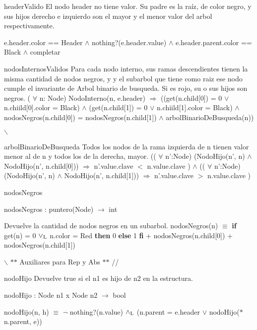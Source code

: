 \begin{DoxyParagraph}{header\-Valido}
\-El nodo header no tiene valor. \-Su padre es la raíz, de color negro, y sus hijos derecho e izquierdo son el mayor y el menor valor del arbol respectivamente.\par
 e.\-header.\-color == \-Header $\land$ nothing?(e.\-header.\-value) $\land$ e.\-header.\-parent.\-color == \-Black $\land$ completar 
\end{DoxyParagraph}
\begin{DoxyParagraph}{nodos\-Internos\-Validos}
\-Para cada nodo interno, sus ramas descendientes tienen la misma cantidad de nodos negros, y y el subarbol que tiene como raiz ese nodo cumple el invariante de \-Arbol binario de busqueda. \-Si es rojo, su o sus hijos son negros. ( $\forall$ n\-: \-Node) \-Nodo\-Interno(n, e.\-header) $\Rightarrow$ ((get(n.\-child\mbox{[}0\mbox{]}) = 0 $\lor$ n.\-chiild\mbox{[}0\mbox{]}.color = \-Black) $\land$ (get(n.\-child\mbox{[}1\mbox{]}) = 0 $\lor$ n.\-chiild\mbox{[}1\mbox{]}.color = \-Black) $\land$ nodos\-Negros(n.\-child\mbox{[}0\mbox{]}) = nodos\-Negros(n.\-child\mbox{[}1\mbox{]}) $\land$ arbol\-Binario\-De\-Busqueda(n)) 
\end{DoxyParagraph}
$\backslash$

\begin{DoxyParagraph}{arbol\-Binario\-De\-Busqueda}
\-Todos los nodos de la rama izquierda de n tienen valor menor al de n y todos los de la derecha, mayor. (( $\forall$ n'\-:\-Node) (\-Nodo\-Hijo(n', n) $\land$ \-Nodo\-Hijo(n', n.\-child\mbox{[}0\mbox{]})) $\Rightarrow$ n'.value.\-clave $<$ n.\-value.\-clave ) $\land$ (( $\forall$ n'\-:\-Node) (\-Nodo\-Hijo(n', n) $\land$ \-Nodo\-Hijo(n', n.\-child\mbox{[}1\mbox{]})) $\Rightarrow$ n'.value.\-clave $>$ n.\-value.\-clave )
\end{DoxyParagraph}
\begin{DoxyParagraph}{nodos\-Negros}

\end{DoxyParagraph}
nodos\-Negros \-: puntero(\-Node) $\to$ int\par
 \-Devuelve la cantidad de nodos negros en un subarbol. nodos\-Negros(n) $\equiv$ {\bfseries if} get(n) = 0 $\lor_{\rm L}$ n.\-color = \-Red {\bfseries then} 0 {\bfseries else} 1 {\bfseries fi} + nodos\-Negros(n.\-child\mbox{[}0\mbox{]}) + nodos\-Negros(n.\-child\mbox{[}1\mbox{]}) 

$\backslash$ $\ast$$\ast$ \-Auxiliares para \-Rep y \-Abs $\ast$$\ast$ //

\begin{DoxyParagraph}{nodo\-Hijo}
\-Devuelve true si el n1 es hijo de n2 en la estructura.
\end{DoxyParagraph}
nodo\-Hijo \-: \-Node n1 x \-Node n2 $\to$ bool\par
 nodo\-Hijo(n, h) $\equiv$ $\lnot$ nothing?(n.\-value) $\land_{\rm L}$ (n.\-parent = e.\-header $\lor$ nodo\-Hijo($\ast$n.parent, e)) 

